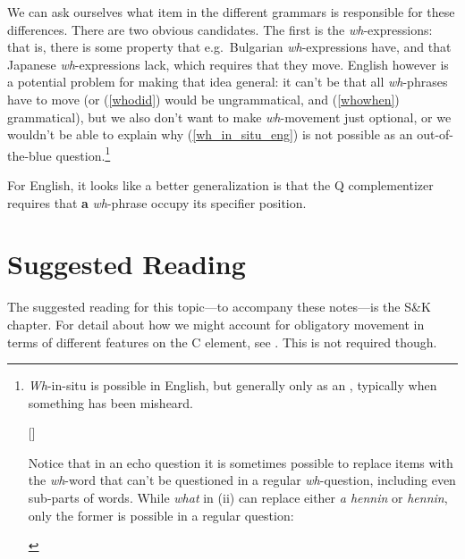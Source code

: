 \documentclass{article}
\begin{document}
We can ask ourselves what item in the different grammars is responsible for these differences.
There are two obvious candidates.
The first is the \emph{wh}-expressions: that is, there is some property that e.g.\ Bulgarian \emph{wh}-expressions have, and that Japanese \emph{wh}-expressions lack, which requires that they move.
English however is a potential problem for making that idea general: it can't be that all \emph{wh}-phrases have to move (or (\ref{whodid}) would be ungrammatical, and (\ref{whowhen}) grammatical), but we also don't want to make \emph{wh}-movement just optional, or we wouldn't be able to explain why (\ref{wh_in_situ_eng}) is not possible as an out-of-the-blue question.\footnote{\emph{Wh}-in-situ is possible in English, but generally only as an , typically when something has been misheard.
\begin{exe}
    []{
    \begin{xlistA}
    \end{xlistA}}%
\end{exe}
Notice that in an echo question it is sometimes possible to replace items with the \emph{wh}-word that can't be questioned in a regular \emph{wh}-question, including even sub-parts of words.
While \emph{what} in (ii) can replace either \emph{a hennin} or \emph{hennin}, only the former is possible in a regular question:
\begin{exe}
\begin{multicols}{2}
    \end{multicols}
\end{exe}
}
\begin{exe}
    \label{wh_in_situ_eng}
\end{exe}

For English, it looks like a better generalization is that the Q complementizer requires that \textbf{a} \emph{wh}-phrase occupy its specifier position. 

\section*{Suggested Reading}
The suggested reading for this topic---to accompany these notes---is the S\&K chapter.
For detail about how we might account for obligatory movement in terms of different features on the C element, see \citet[][289--297, 341--358]{adger_core_2003}.
This is not required though.

\printbibliography
\end{document}
